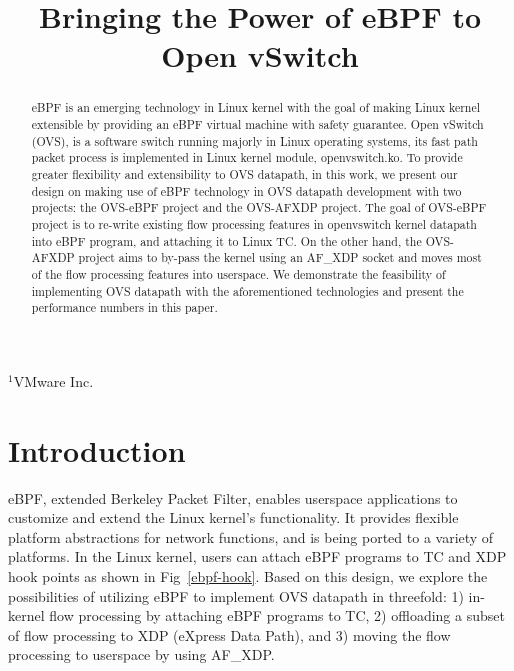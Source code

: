 \documentclass[10pt]{sigplanconf}
\begin{document}
\title{Bringing the Power of eBPF to Open vSwitch}
{$^1$VMware Inc.}{}

\maketitle

\begin{abstract}
eBPF is an emerging technology in Linux kernel with the goal of making Linux kernel
extensible by providing an eBPF virtual machine with safety guarantee.
Open vSwitch (OVS), is a software switch running majorly in Linux
operating systems, its fast path packet process is implemented in Linux kernel
module, openvswitch.ko.
To provide greater flexibility and extensibility to OVS datapath, in this
work, we present our design on making use of eBPF technology in OVS datapath
development with two projects: the OVS-eBPF project and the OVS-AFXDP project.
The goal of OVS-eBPF project is to re-write existing flow processing features
in openvswitch kernel datapath into eBPF program, and attaching it
to Linux TC.
On the other hand, the OVS-AFXDP project aims to by-pass the kernel
using an AF\_XDP socket and moves most of the flow processing features
into userspace.
We demonstrate the feasibility of implementing OVS datapath with the
aforementioned technologies and present the performance numbers in this paper.
\end{abstract}

\section{Introduction}\label{introduction}

eBPF, extended Berkeley Packet Filter, enables userspace applications to
customize and extend the Linux kernel's functionality. It provides
flexible platform abstractions for network functions, and is being ported
to a variety of platforms. In the Linux kernel, users can attach eBPF programs
to TC and XDP hook points as shown in Fig~\ref{ebpf-hook}. Based on this
design, we explore the possibilities of utilizing eBPF to implement OVS
datapath in threefold:
1) in-kernel flow processing by attaching eBPF programs to TC,
2) offloading a subset of flow processing to XDP (eXpress Data Path),
and 3) moving the flow processing to userspace by using AF\_XDP.
\end{document}
